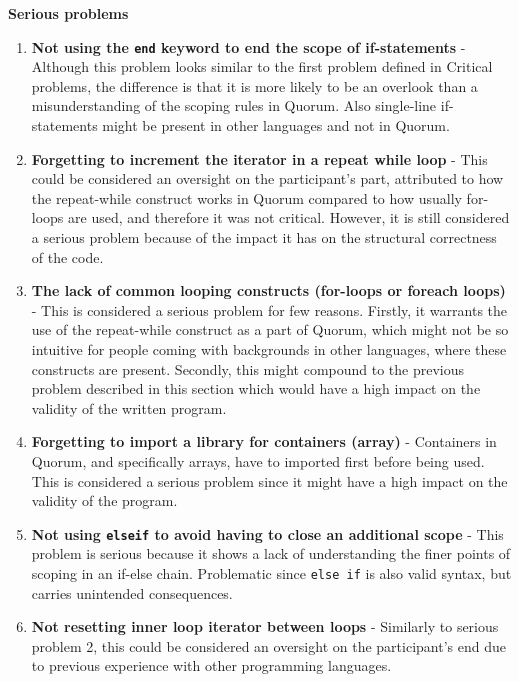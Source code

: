 \textbf{Serious problems}
\begin{enumerate}
\item \textbf{Not using the \lstinline!end! keyword to end the scope of if-statements} - Although this problem looks similar to the first problem defined in Critical problems, the difference is that it is more likely to be an overlook than a misunderstanding of the scoping rules in Quorum. Also single-line if-statements might be present in other languages and not in Quorum.\\
\item \textbf{Forgetting to increment the iterator in a repeat while loop} - This could be considered an oversight on the participant’s part, attributed to how the repeat-while construct works in Quorum compared to how usually for-loops are used, and therefore it was not critical. However, it is still considered a serious problem because of the impact it has on the structural correctness of the code.
\item \textbf{The lack of common looping constructs (for-loops or foreach loops)} - This is considered a serious problem for few reasons. Firstly, it warrants the use of the repeat-while construct as a part of Quorum, which might not be so intuitive for people coming with backgrounds in other languages, where these constructs are present. Secondly, this might compound to the previous problem described in this section which would have a high impact on the validity of the written program. 
\item \textbf{Forgetting to import a library for containers (array)} - Containers in Quorum, and specifically arrays, have to imported first before being used. This is considered a serious problem since it might have a high impact on the validity of the program. 
\item \textbf{Not using \lstinline!elseif! to avoid having to close an additional scope} - This problem is serious because it shows a lack of understanding the finer points of scoping in an if-else chain. Problematic since \lstinline!else if! is also valid syntax, but carries unintended consequences.
\item \textbf{Not resetting inner loop iterator between loops} - Similarly to serious problem 2, this could be considered an oversight on the participant’s end due to previous experience with other programming languages.
\end{enumerate}

